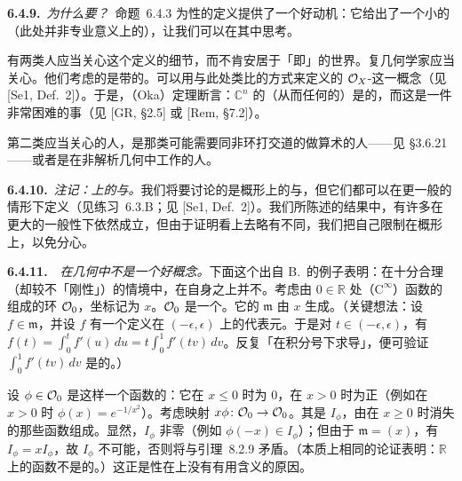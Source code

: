 \textbf{6.4.9.}\ \emph{为什么要\trCoh{}？}\ 命题~6.4.3 为\trCoh{}性的定义提供了一个好动机：它给出了一个小的（此处并非专业意义上的）\trAbelianCategory，让我们可以在其中思考\trVectorBundle。

有两类人应当关心这个定义的细节，而不肯安居于「\trCoh{}即\trFiniteType」的\trNoetherian{}世界。复几何学家应当关心。他们考虑的是带\trClassicalTopology{}的\trComplexAnalyticSpace。可以用与此处类比的方式来定义\trCoh{}的 $\mathcal{O}_X$-\trModule{}这一概念（见 [Se1, Def.~2]）。于是，\trOka{}（Oka）定理断言：$\mathbb{C}^n$ 的\trStructureSheaf{}（从而任何\trComplex\trManifold{}的\trStructureSheaf）是\trCoh{}的，而这是一件非常困难的事（见 [GR, \S2.5] 或 [Rem, \S7.2]）。

第二类应当关心的人，是那类可能需要同非\trNoetherian{}环打交道的做算术的人——见 \S3.6.21——或者是在非\trNonArchimedean{}解析几何中工作的人。

\textbf{6.4.10.}\ \emph{注记：\trRingedSpace{}上的\trQCSheaf{}与\trCoherentSheaf。}\quad 我们将要讨论的是概形上的\trQCSheaf{}与\trCoherentSheaf，但它们都可以在更一般的情形下定义（\trQCSheaf{}见练习~6.3.B；\trCoherentSheaf{}见 [Se1, Def.~2]）。我们所陈述的结果中，有许多在更大的一般性下依然成立，但由于证明看上去略有不同，我们把自己限制在概形上，以免分心。

\textbf{6.4.11.}\ \extrahard\ \emph{\trCoh{}在\trSmooth{}几何中不是一个好概念。}\quad 下面这个出自 B.~\trConrad{}的例子表明：在十分合理（却较不「刚性」）的情境中，\trStructureSheaf{}在自身之上并不\trCoh。考虑由 $0\in\mathbb{R}$ 处\trSmooth{}（$\mathrm{C}^{\infty}$）函数的\trGerm{}组成的环 $\mathcal{O}_0$，坐标记为 $x$。$\mathcal{O}_0$ 是一个\trLocalRing。它的\trMaximalIdeal{} $\mathfrak{m}$ 由 $x$ 生成。（关键想法：设 $f\in\mathfrak{m}$，并设 $f$ 有一个定义在 $(-\epsilon,\epsilon)$ 上的代表元。于是对 $t\in(-\epsilon,\epsilon)$，有 $f(t)=\int_0^t f'(u)\,du=t\int_0^1 f'(tv)\,dv$。反复「在积分号下求导」，便可验证 $\int_0^1 f'(tv)\,dv$ 是\trSmooth{}的。）

设 $\phi\in\mathcal{O}_0$ 是这样一个\trSmooth{}函数的\trGerm：它在 $x\le 0$ 时为 $0$，在 $x>0$ 时为正（例如在 $x>0$ 时 $\phi(x)=e^{-1/x^{2}}$）。考虑映射 $x\phi\colon\mathcal{O}_0\to\mathcal{O}_0$。其\trKernel{}是\trIdeal{} $I_\phi$，由在 $x\ge 0$ 时消失的那些函数组成。显然，$I_\phi$ 非零（例如 $\phi(-x)\in I_\phi$）；但由于 $\mathfrak{m}=(x)$，有 $I_\phi=xI_\phi$，故 $I_\phi$ 不可能\trFinitelyGenerated，否则将与\trNakayama{}引理~8.2.9 矛盾。（本质上相同的论证表明：$\mathbb{R}$ 上的\trSmooth{}函数\trSheaf{}不是\trCoh{}的。）这正是\trCoh{}性在\trSmooth\trManifold{}上没有有用含义的原因。
